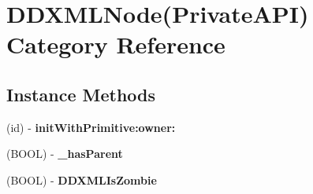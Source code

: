 \hypertarget{category_d_d_x_m_l_node_07_private_a_p_i_08}{}\section{D\+D\+X\+M\+L\+Node(Private\+A\+P\+I) Category Reference}
\label{category_d_d_x_m_l_node_07_private_a_p_i_08}
\subsection*{Instance Methods}
\begin{DoxyCompactItemize}
\item 
\hypertarget{category_d_d_x_m_l_node_07_private_a_p_i_08_acfefba9f92fb7e32c9760678248d8eb5}{}(id) -\/ {\bfseries init\+With\+Primitive\+:owner\+:}\label{category_d_d_x_m_l_node_07_private_a_p_i_08_acfefba9f92fb7e32c9760678248d8eb5}

\item 
\hypertarget{category_d_d_x_m_l_node_07_private_a_p_i_08_abf9073950f62f1f1b6ffd7e63bd0c69b}{}(B\+O\+O\+L) -\/ {\bfseries \+\_\+has\+Parent}\label{category_d_d_x_m_l_node_07_private_a_p_i_08_abf9073950f62f1f1b6ffd7e63bd0c69b}

\item 
\hypertarget{category_d_d_x_m_l_node_07_private_a_p_i_08_aced0d5d6cc605b480e3c39ff54132c07}{}(B\+O\+O\+L) -\/ {\bfseries D\+D\+X\+M\+L\+Is\+Zombie}\label{category_d_d_x_m_l_node_07_private_a_p_i_08_aced0d5d6cc605b480e3c39ff54132c07}

\end{DoxyCompactItemize}
